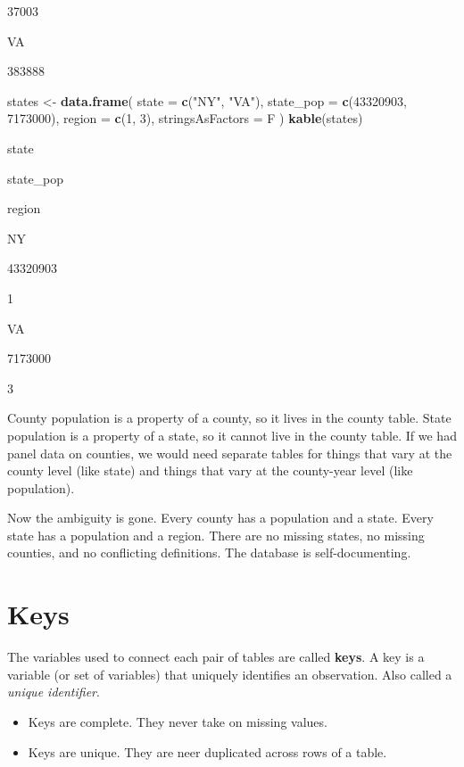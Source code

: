 \documentclass[]{book}
\newenvironment{Shaded}{\begin{snugshade}}{\end{snugshade}}
\newcommand{\KeywordTok}[1]{\textcolor[rgb]{0.13,0.29,0.53}{\textbf{#1}}}
\newcommand{\DataTypeTok}[1]{\textcolor[rgb]{0.13,0.29,0.53}{#1}}
\newcommand{\DecValTok}[1]{\textcolor[rgb]{0.00,0.00,0.81}{#1}}
\newcommand{\StringTok}[1]{\textcolor[rgb]{0.31,0.60,0.02}{#1}}
\newcommand{\NormalTok}[1]{#1}
\providecommand{\tightlist}{%
  \setlength{\itemsep}{0pt}\setlength{\parskip}{0pt}}
\begin{document}
37003

VA

383888

\begin{Shaded}
\begin{Highlighting}[]

\NormalTok{states <-}\StringTok{ }\KeywordTok{data.frame}\NormalTok{(}
  \DataTypeTok{state =} \KeywordTok{c}\NormalTok{(}\StringTok{"NY"}\NormalTok{, }\StringTok{"VA"}\NormalTok{),}
  \DataTypeTok{state_pop =} \KeywordTok{c}\NormalTok{(}\DecValTok{43320903}\NormalTok{, }\DecValTok{7173000}\NormalTok{),}
  \DataTypeTok{region =} \KeywordTok{c}\NormalTok{(}\DecValTok{1}\NormalTok{, }\DecValTok{3}\NormalTok{), }\DataTypeTok{stringsAsFactors =}\NormalTok{ F}
\NormalTok{)}
\KeywordTok{kable}\NormalTok{(states)}
\end{Highlighting}
\end{Shaded}

state

state\_pop

region

NY

43320903

1

VA

7173000

3

County population is a property of a county, so it lives in the county
table. State population is a property of a state, so it cannot live in
the county table. If we had panel data on counties, we would need
separate tables for things that vary at the county level (like state)
and things that vary at the county-year level (like population).

Now the ambiguity is gone. Every county has a population and a state.
Every state has a population and a region. There are no missing states,
no missing counties, and no conflicting definitions. The database is
self-documenting.

\section{Keys}\label{keys-1}

The variables used to connect each pair of tables are called
\textbf{keys}. A key is a variable (or set of variables) that uniquely
identifies an observation. Also called a \emph{unique identifier}.

\begin{itemize}
\tightlist
\item
  Keys are complete. They never take on missing values.
\item
  Keys are unique. They are neer duplicated across rows of a table.
\end{itemize}
\end{document}
